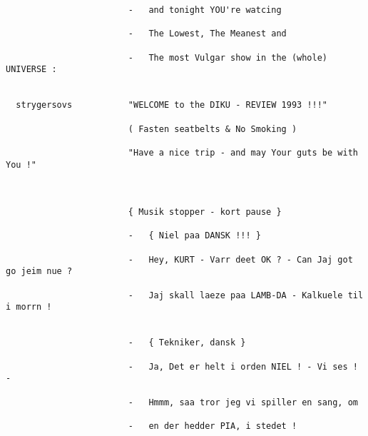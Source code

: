 \documentclass[a4paper,11pt]{article}
\begin{document}
\begin{sketch}
\begin{verbatim}
                        -   and tonight YOU're watcing

                        -   The Lowest, The Meanest and 

                        -   The most Vulgar show in the (whole) UNIVERSE :


  strygersovs           "WELCOME to the DIKU - REVIEW 1993 !!!"

                        ( Fasten seatbelts & No Smoking ) 

                        "Have a nice trip - and may Your guts be with You !"



                        { Musik stopper - kort pause }

                        -   { Niel paa DANSK !!! }

                        -   Hey, KURT - Varr deet OK ? - Can Jaj got go jeim nue ?

                        -   Jaj skall laeze paa LAMB-DA - Kalkuele til i morrn !


                        -   { Tekniker, dansk }

                        -   Ja, Det er helt i orden NIEL ! - Vi ses ! -

                        -   Hmmm, saa tror jeg vi spiller en sang, om

                        -   en der hedder PIA, i stedet ! 

\end{verbatim}
\end{sketch}
\end{document}
